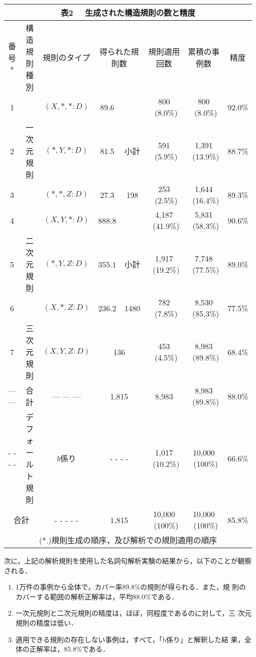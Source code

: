  \begin{center}
   \setlength{\tabcolsep}{3pt}
   \small
    \begin{tabular}{|c|c|c|c|c|c|c|c|}
    \multicolumn{8}{c}{{\small {\bf 表2} \ \ 生成された構造規則の数と精度}}
     \\ \hline
     番号*&構造規則種別&規則のタイプ&\multicolumn{2}{c|}{得られた規則数}
     & 規則適用回数&累積の事例数&精度 \\ \hline
    1& & $(X,*,*:D)$ &89.6& & 800 \ (8.0\%)& 800 \ (8.0\%)&92.0\% \\
     \cline{1-1}\cline{3-3}\cline{4-4}\cline{6-8}
    2&一次元規則&$(*,Y,*:D)$&81.5&小計 & 591 \ (5.9\%)&1,391 \
     (13.9\%)&88.7\% \\
     \cline{1-1}\cline{3-3}\cline{4-4}\cline{6-8}
    3& & $(*,*,Z:D)$&27.3&198&253 \ (2.5\%)&1,644 \ (16.4\%)&89.3\%\\ \hline
    4& &$(X,Y,*:D)$&888.8& &4,187 \ (41.9\%)&5,831 \ (58.3\%)&90.6\%\\
     \cline{1-1}\cline{3-3}\cline{4-4}\cline{6-8}
    5&二次元規則&$(*,Y,Z:D)$&355.1&小計&1,917 \ (19.2\%)&7,748 \
     (77.5\%)&89.0\%\\ \cline{1-1}\cline{3-3}\cline{4-4}\cline{6-8}
    6& & $(X,*,Z:D)$&236.2&1480&782 \ (7.8\%)&8,530 \ (85.3\%)&77.5\%\\  \hline
    7&三次元規則& $(X,Y,Z:D)$&\multicolumn{2}{c|}{136}&453 \ (4.5\%)&8,983 \
     (89.8\%)&68.4\% \\ \hline
    --- ---&合計&--- --- ---&\multicolumn{2}{c|}{1,815}&8,983&8,983 \
     (89.8\%)&88.0\% \\ \hline
    - - - -&デフォールト規則&$b$係り&\multicolumn{2}{c|}{- - - -}&1,017 \
     (10.2\%)&10,000 \ (100\%)&66.6\%\\ \hline
    \multicolumn{2}{|c|}{合計}&- - - -
     -&\multicolumn{2}{c|}{1,815}&10,000 \ (100\%)&10,000 \
     (100\%)&85.8\% \\ \hline 
    \multicolumn{8}{c}{($*$.)規則生成の順序，及び解析での規則適用の順序}
\end{tabular}
\end{center}

\hspace*{-5mm}{\bf＜解析実験結果＞}

次に，上記の解析規則を使用した名詞句解析実験の結果から，以下のことが観察
される．
\begin{enumerate}
 \item 1万件の事例から全体で，カバー率$89.8\%$の規則が得られる．また，規
       則のカバーする範囲の解析正解率は，平均$88.0\%$である．
 \item 一次元規則と二次元規則の精度は，ほぼ，同程度であるのに対して，三
       次元規則の精度は低い．
 \item 適用できる規則の存在しない事例は，すべて，「b係り」と解釈した結
       果，全体の正解率は，$85.8\%$である．
\end{enumerate}\vspace{\baselineskip}

